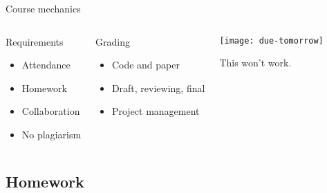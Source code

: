 \documentclass[t]{beamer}
\begin{document}
  \begin{frame}[t]{Course mechanics}

  \begin{columns}[T]


    \begin{block}{Requirements}
      \begin{itemize}
        \item Attendance
        \item Homework
        \item Collaboration
        \item No plagiarism
      \end{itemize}
    \end{block}
  
    \begin{alertblock}{Grading}
      \begin{itemize}
        \item Code and paper 
        \item Draft, reviewing, final
        \item Project management
      \end{itemize}
    \end{alertblock}


    \begin{center}
      \texttt{[image: due-tomorrow]}\vspace{1em}
      
      This won't work.
    \end{center}

  \end{columns} 
    
  \end{frame}

  \subsection{Homework}
  
\end{document}

